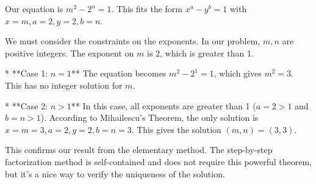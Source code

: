 Our equation is $m^2 - 2^n = 1$.
This fits the form $x^a - y^b = 1$ with $x=m, a=2, y=2, b=n$.

We must consider the constraints on the exponents. In our problem, $m, n$ are positive integers. The exponent on $m$ is $2$, which is greater than 1.

*   **Case 1: $n=1$**
    The equation becomes $m^2 - 2^1 = 1$, which gives $m^2 = 3$. This has no integer solution for $m$.

*   **Case 2: $n>1$**
    In this case, all exponents are greater than 1 ($a=2>1$ and $b=n>1$). According to Mihailescu's Theorem, the only solution is $x=m=3, a=2, y=2, b=n=3$.
    This gives the solution $(m,n) = (3,3)$.

This confirms our result from the elementary method. The step-by-step factorization method is self-contained and does not require this powerful theorem, but it's a nice way to verify the uniqueness of the solution.